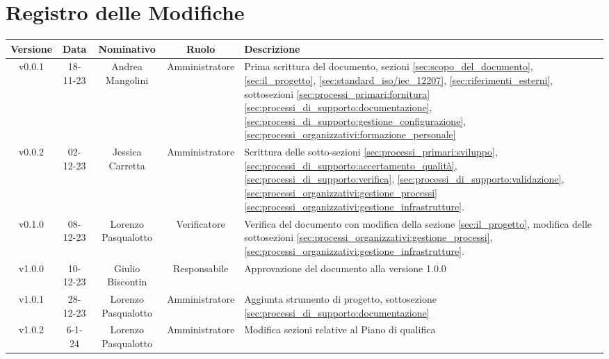 \section*{\Large Registro delle Modifiche}
    \begin{table}[h]
        \centering
        \renewcommand\tabularxcolumn[1]{m{#1}} %
        \renewcommand{\arraystretch}{1.5}
        \begin{tabularx}{0.98\textwidth}
            {c|c|c|c|>{\centering\arraybackslash}X}
            \rowcolor{black}
            \textbf{\color{white} Versione} & \textbf{\color{white} Data} & \textbf{\color{white} Nominativo} & \textbf{\color{white} Ruolo} & \textbf{\color{white} Descrizione} \\ 
            \hline

            v0.0.1 & 18-11-23 & Andrea Mangolini & Amministratore & Prima scrittura del documento, sezioni \ref{sec:scopo_del_documento}, \ref{sec:il_progetto}, \ref{sec:standard_iso/iec_12207}, \ref{sec:riferimenti_esterni}, sottosezioni \ref{sec:processi_primari:fornitura} \ref{sec:processi_di_supporto:documentazione}, \ref{sec:processi_di_supporto:gestione_configurazione}, \ref{sec:processi_organizzativi:formazione_personale} \\

            v0.0.2 & 02-12-23 & Jessica Carretta & Amministratore & Scrittura delle sotto-sezioni \ref{sec:processi_primari:sviluppo}, \ref{sec:processi_di_supporto:accertamento_qualità}, \ref{sec:processi_di_supporto:verifica}, \ref{sec:processi_di_supporto:validazione}, \ref{sec:processi_organizzativi:gestione_processi}\ref{sec:processi_organizzativi:gestione_infrastrutture}. \\

            v0.1.0 & 08-12-23 & Lorenzo Pasqualotto & Verificatore & 
            Verifica del documento con modifica della sezione \ref{sec:il_progetto}, modifica delle sottosezioni
            \ref{sec:processi_organizzativi:gestione_processi},
            \ref{sec:processi_organizzativi:gestione_infrastrutture}.\\

            v1.0.0 & 10-12-23 & Giulio Biscontin & Responsabile & 
            Approvazione del documento alla versione 1.0.0 \\

            v1.0.1 & 28-12-23 & Lorenzo Pasqualotto & Amministratore & Aggiunta strumento di progetto, sottosezione \ref{sec:processi_di_supporto:documentazione}\\

            v1.0.2 & 6-1-24 & Lorenzo Pasqualotto & Amministratore & Modifica sezioni relative al Piano di qualifica \\

            \hline
        \end{tabularx}
    \end{table}